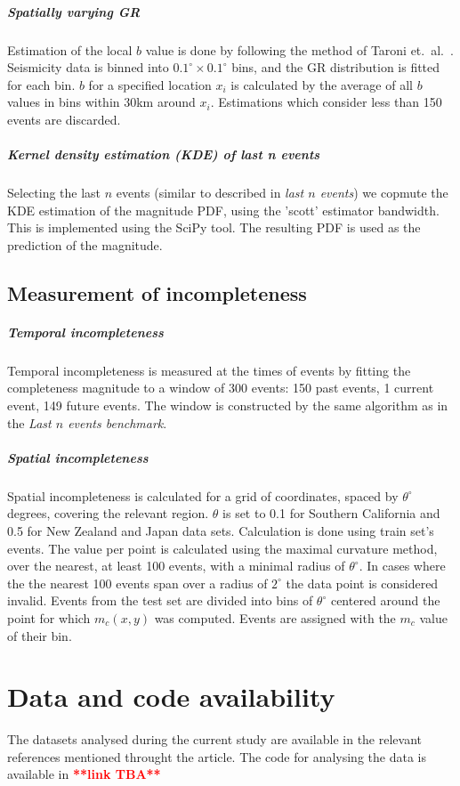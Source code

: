\documentclass[pdflatex]{sn-jnl}
\begin{document}
\subparagraph{Spatially varying GR} Estimation of the local $b$ value is done by following the method of Taroni et.~al.~\cite{taroni_highdefinition_2021}. Seismicity data is 
binned into $0.1^\circ \times 0.1^\circ$ bins, and the GR distribution is fitted for each bin. $b$ for a specified location $x_i$ is calculated by the average of all $b$ values in bins within 30km around $x_i$. Estimations which consider less than 150 events are discarded.

\subparagraph{Kernel density estimation (KDE) of last n events} Selecting the last $n$ events (similar to described in \textit{last $n$ events}) we copmute the KDE estimation of the magnitude PDF, using the 'scott' estimator bandwidth\cite{scott_2015}. This is implemented using the SciPy tool\cite{scipy_2020}. The resulting PDF is used as the prediction of the magnitude.

\subsection{Measurement of incompleteness}
\subparagraph{Temporal incompleteness} Temporal incompleteness is measured at the times of events by fitting the completeness magnitude to a window of 300 events: 150 past events, 1 current event, 149 future events. The window is constructed by the same algorithm as in the \textit{Last $n$ events benchmark}.

\subparagraph{Spatial incompleteness} Spatial incompleteness is calculated for a grid of coordinates, spaced by $\theta^\circ$ degrees, covering the relevant region. $\theta$ is set to 0.1 for Southern California and 0.5 for New Zealand and Japan data sets. Calculation is done using train set's events. The value per point is calculated using the maximal curvature method\cite{wiemer_minimum_2000}, over the nearest, at least 100 events, with a minimal radius of $\theta^\circ$. In cases where the the nearest 100 events span over a radius of $2^\circ$ the data point is considered invalid. Events from the test set are divided into bins of $\theta^\circ$ centered around the point for which $m_c(x,y)$ was computed. Events are assigned with the $m_c$ value of their bin.


\section*{Data and code availability}
The datasets analysed during the current study are available in the relevant references mentioned throught the article.
The code for analysing the data is available in \textcolor{red}{\textbf{**link TBA**}}
\end{document}
